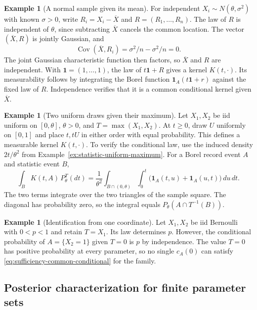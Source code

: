 \documentclass[11pt,oneside]{book}
\theoremstyle{definition}
\newtheorem{example}[theorem]{Example}
\theoremstyle{remark}
\begin{document}
\begin{example}[A normal sample given its mean]
\label{ex:sufficiency-normal-mean}
For independent $X_i\sim N(\theta,\sigma^2)$ with known $\sigma>0$,
write $R_i=X_i-\overline X$ and $R=(R_1,\ldots,R_n)$.
The law of $R$ is independent of $\theta$, since subtracting
$\overline X$ cancels the common location. The vector
$(\overline X,R)$ is jointly Gaussian, and
\[
\operatorname{Cov}(\overline X,R_i)
=\sigma^2/n-\sigma^2/n=0 .
\]
The joint Gaussian characteristic function then factors, so
$\overline X$ and $R$ are independent. With
$\mathbf 1=(1,\ldots,1)$, the law of $t\mathbf 1+R$ gives a
kernel $K(t,\cdot)$. Its measurability follows by integrating
the Borel function $\mathbf 1_A(t\mathbf 1+r)$ against the
fixed law of $R$. Independence verifies that it is a common
conditional kernel given $\overline X$.
\end{example}

\begin{example}[Two uniform draws given their maximum]
\label{ex:sufficiency-uniform-maximum-pair}
Let $X_1,X_2$ be iid uniform on $[0,\theta]$, $\theta>0$,
and $T=\max(X_1,X_2)$. At $t\geq0$, draw $U$ uniformly on
$[0,1]$ and place $t,tU$ in either order with equal probability.
This defines a measurable kernel $K(t,\cdot)$. To verify the
conditional law, use the induced density $2t/\theta^2$ from
Example~\ref{ex:statistic-uniform-maximum}. For a Borel record
event $A$ and statistic event $B$,
\[
\int_B K(t,A)\,P_\theta^T(dt)
=\frac{1}{\theta^2}\int_{B\cap(0,\theta)}
  \int_0^t \bigl(\mathbf 1_A(t,u)+\mathbf 1_A(u,t)\bigr)\,du\,dt.
\]
The two terms integrate over the two triangles of the sample
square. The diagonal has probability zero, so the integral
equals $P_\theta(A\cap T^{-1}(B))$.
\end{example}

\begin{example}[Identification from one coordinate]
\label{ex:sufficiency-first-bernoulli-coordinate}
Let $X_1,X_2$ be iid Bernoulli with $0<p<1$ and retain
$T=X_1$. Its law determines $p$. However, the conditional
probability of $A=\{X_2=1\}$ given $T=0$ is $p$ by independence.
The value $T=0$ has positive probability at every parameter,
so no single $c_A(0)$ can satisfy
\eqref{eq:sufficiency-common-conditional} for the family.
\end{example}

\subsection{Posterior characterization for finite parameter sets}
\label{subsec:sufficiency-finite-posterior}
\end{document}
